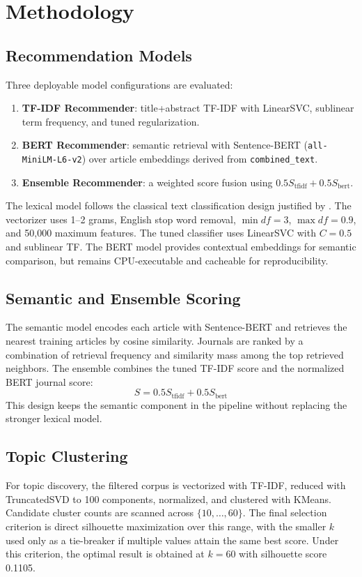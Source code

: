 \documentclass[conference]{IEEEtran}
\begin{document}
\section{Methodology}
\subsection{Recommendation Models}
Three deployable model configurations are evaluated:
\begin{enumerate}
\item \textbf{TF-IDF Recommender}: title+abstract TF-IDF with LinearSVC, sublinear term frequency, and tuned regularization.
\item \textbf{BERT Recommender}: semantic retrieval with Sentence-BERT (\texttt{all-MiniLM-L6-v2}) over article embeddings derived from \texttt{combined\_text}.
\item \textbf{Ensemble Recommender}: a weighted score fusion using $0.5 S_{\text{tfidf}} + 0.5 S_{\text{bert}}$.
\end{enumerate}

The lexical model follows the classical text classification design justified by \cite{salton1988term,joachims1998svm}. The vectorizer uses 1--2 grams, English stop word removal, $\min df=3$, $\max df=0.9$, and 50{,}000 maximum features. The tuned classifier uses LinearSVC with $C=0.5$ and sublinear TF. The BERT model provides contextual embeddings for semantic comparison, but remains CPU-executable and cacheable for reproducibility.

\subsection{Semantic and Ensemble Scoring}
The semantic model encodes each article with Sentence-BERT and retrieves the nearest training articles by cosine similarity. Journals are ranked by a combination of retrieval frequency and similarity mass among the top retrieved neighbors. The ensemble combines the tuned TF-IDF score and the normalized BERT journal score:
\[
S = 0.5 S_{\text{tfidf}} + 0.5 S_{\text{bert}}
\]
This design keeps the semantic component in the pipeline without replacing the stronger lexical model.

\subsection{Topic Clustering}
For topic discovery, the filtered corpus is vectorized with TF-IDF, reduced with TruncatedSVD to 100 components, normalized, and clustered with KMeans. Candidate cluster counts are scanned across $\{10,\dots,60\}$. The final selection criterion is direct silhouette maximization over this range, with the smaller $k$ used only as a tie-breaker if multiple values attain the same best score. Under this criterion, the optimal result is obtained at $k=60$ with silhouette score 0.1105.
\end{document}
